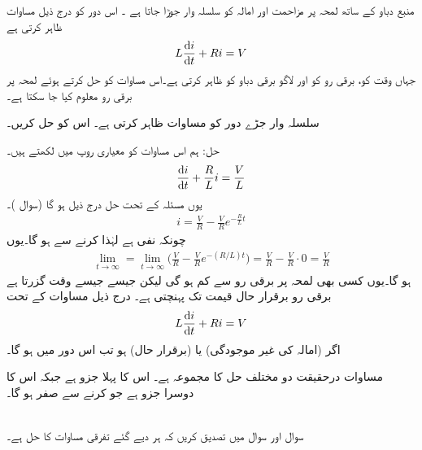 منبع دباو  کے ساتھ لمحہ  پر  مزاحمت  اور امالہ  کو سلسلہ وار جوڑا جاتا ہے ۔ اس دور کو درج ذیل مساوات ظاہر کرتی ہے
\begin{align}\label{مساوات_ماورائی_برقی_دور}
L\frac{\dif i}{\dif t}+Ri=V
\end{align}
جہاں  وقت کو،  برقی رو کو اور  لاگو برقی دباو کو ظاہر کرتی ہے۔اس مساوات کو حل کرتے ہوئے لمحہ  پر برقی رو  معلوم کیا جا سکتا ہے۔ 

سلسلہ وار جڑے  دور کو مساوات  ظاہر کرتی ہے۔ اس کو حل کریں۔

حل:\quad
ہم اس مساوات کو معیاری روپ میں لکھتے ہیں۔
\begin{align}\label{مساوات_ماورائی_سلسلہ_وار_تفرقی}
\frac{\dif i}{\dif t}+\frac{R}{L}i=\frac{V}{L}
\end{align}
یوں مسئلہ  کے تحت حل درج ذیل ہو گا (سوال )۔
\begin{align}\label{مساوات_ماورائی_سلسلہ_وار_دور_حل}
i=\frac{V}{R}-\frac{V}{R}e^{-\tfrac{R}{L}t}
\end{align}
چونکہ  نفی ہے لہٰذا  کرنے سے  ہو گا۔یوں 
\begin{align*}
\lim_{t\to \infty}=\lim_{t\to \infty}\big(\frac{V}{R}-\frac{V}{R}e^{-(R/L)t}\big)=\frac{V}{R}-\frac{V}{R}\cdot 0=\frac{V}{R}
\end{align*}
ہو گا۔یوں کسی بھی لمحہ پر برقی رو  سے کم ہو گی لیکن جیسے جیسے وقت گزرتا ہے برقی رو برقرار حال قیمت  تک پہنچتی ہے۔  درج ذیل مساوات کے تحت
\begin{align*}
L\frac{\dif i}{\dif t}+Ri=V
\end{align*}
اگر  (امالہ کی غیر موجودگی) یا  (برقرار حال) ہو تب اس دور میں  ہو گا۔

مساوات  درحقیقت دو مختلف حل کا مجموعہ ہے۔ اس کا پہلا جزو    ہے جبکہ اس کا دوسرا جزو    ہے جو  کرنے سے صفر ہو گا۔

\\
سوال  اور سوال  میں تصدیق کریں کہ ہر  دیے گئے تفرقی مساوات کا حل ہے۔

